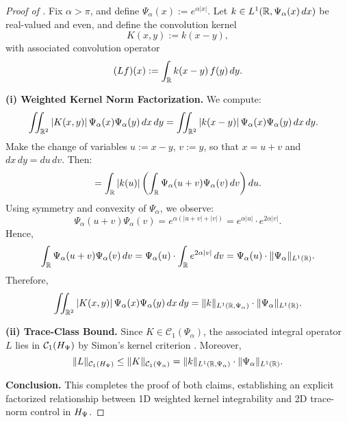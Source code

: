 \begin{proof}[Proof of ]
Fix \( \alpha > \pi \), and define \( \Psi_\alpha(x) := e^{\alpha |x|} \). Let \( k \in L^1(\mathbb{R}, \Psi_\alpha(x)\, dx) \) be real-valued and even, and define the convolution kernel
\[
K(x,y) := k(x - y),
\]
with associated convolution operator
\[
(L f)(x) := \int_{\mathbb{R}} k(x - y)\, f(y)\, dy.
\]

\medskip
\noindent\textbf{(i) Weighted Kernel Norm Factorization.}
We compute:
\begin{align*}
\iint_{\mathbb{R}^2} |K(x,y)|\, \Psi_\alpha(x)\Psi_\alpha(y)\, dx\, dy
&= \iint_{\mathbb{R}^2} |k(x - y)|\, \Psi_\alpha(x)\Psi_\alpha(y)\, dx\, dy.
\end{align*}
Make the change of variables \( u := x - y \), \( v := y \), so that \( x = u + v \) and \( dx\,dy = du\,dv \). Then:
\[
= \int_{\mathbb{R}} |k(u)| \left( \int_{\mathbb{R}} \Psi_\alpha(u + v)\Psi_\alpha(v)\, dv \right) du.
\]
Using symmetry and convexity of \( \Psi_\alpha \), we observe:
\[
\Psi_\alpha(u + v)\Psi_\alpha(v) = e^{\alpha(|u + v| + |v|)} = e^{\alpha|u|} \cdot e^{2\alpha|v|}.
\]
Hence,
\[
\int_{\mathbb{R}} \Psi_\alpha(u + v)\Psi_\alpha(v)\, dv = \Psi_\alpha(u) \cdot \int_{\mathbb{R}} e^{2\alpha |v|}\, dv = \Psi_\alpha(u) \cdot \|\Psi_\alpha\|_{L^1(\mathbb{R})}.
\]
Therefore,
\[
\iint_{\mathbb{R}^2} |K(x,y)|\, \Psi_\alpha(x)\Psi_\alpha(y)\, dx\, dy
= \|k\|_{L^1(\mathbb{R}, \Psi_\alpha)} \cdot \|\Psi_\alpha\|_{L^1(\mathbb{R})}.
\]

\medskip
\noindent\textbf{(ii) Trace-Class Bound.}
Since \( K \in \mathcal{C}_1(\Psi_\alpha) \), the associated integral operator \( L \) lies in \( \mathcal{C}_1(H_{\Psi}) \) by Simon’s kernel criterion \cite[Thm.~4.2]{Simon2005TraceIdeals}. Moreover,
\[
\|L\|_{\mathcal{C}_1(H_{\Psi})} \le \|K\|_{\mathcal{C}_1(\Psi_\alpha)}
= \|k\|_{L^1(\mathbb{R}, \Psi_\alpha)} \cdot \|\Psi_\alpha\|_{L^1(\mathbb{R})}.
\]

\medskip
\noindent\textbf{Conclusion.}
This completes the proof of both claims, establishing an explicit factorized relationship between 1D weighted kernel integrability and 2D trace-norm control in \( H_{\Psi} \).
\end{proof}
